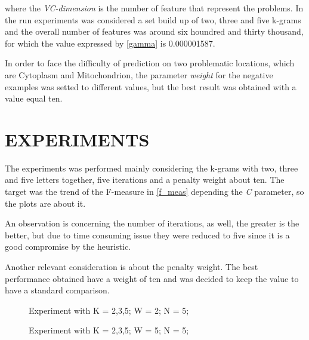 \documentclass{acm_proc_article-sp-sigmod07}
\begin{document}
where the \emph{VC-dimension} is the number of feature that represent the
problems. In the run experiments was considered a set build up of two, three and
five k-grams and the overall number of features was around six houndred and 
thirty thousand, for which the value expressed by \ref{gamma} is 0.000001587.

In order to face the difficulty of prediction on two problematic locations,
which are Cytoplasm and Mitochondrion, the parameter \emph{weight} for the
negative examples was setted to different values, but the best result was 
obtained with a value equal ten.

\section{EXPERIMENTS}
The experiments was performed mainly considering the k-grams with two, three and
five letters together, five iterations and a penalty weight about ten.
The target was the trend of the F-measure in \ref{f_meas} depending the \emph{C}
parameter, so the plots are about it.

An observation is concerning the number of iterations, as well, the greater is 
the better, but due to time consuming issue they were reduced to five since it
is a good compromise by the heuristic. 

Another relevant consideration is about the penalty weight. The best performance
obtained have a weight of ten and was decided to keep the value to have a standard
comparison.


\begin{figure*}
\label{fig:K235W2N5}
\centering
{}
\caption{Experiment with K = 2,3,5; W = 2; N = 5;}
\end{figure*}

\begin{figure*}
\label{fig:K235W5N5}
\centering
{}
\caption{Experiment with K = 2,3,5; W = 5; N = 5;}
\end{figure*}
\end{document}
